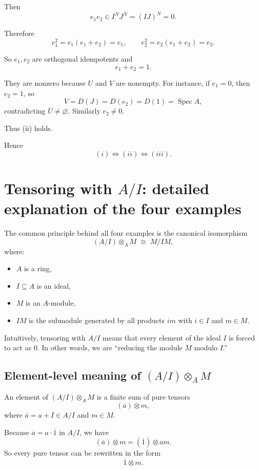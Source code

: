 \documentclass[12pt,a4paper]{article}
\DeclareMathOperator{\Spec}{Spec}
\theoremstyle{plain}
\theoremstyle{definition}      %
\begin{document}
	Then
	\[
	e_1e_2\in I^N J^N=(IJ)^N=0.
	\]
	
	Therefore
	\[
	e_1^2=e_1(e_1+e_2)=e_1,
	\qquad
	e_2^2=e_2(e_1+e_2)=e_2.
	\]
	
	So \(e_1,e_2\) are orthogonal idempotents and
	\[
	e_1+e_2=1.
	\]
	
	They are nonzero because \(U\) and \(V\) are nonempty.
	For instance, if \(e_1=0\), then \(e_2=1\), so
	\[
	V=D(J)=D(e_2)=D(1)=\Spec A,
	\]
	contradicting \(U\neq\varnothing\).
	Similarly \(e_2\neq 0\).
	
	Thus (ii) holds.
	
	\bigskip
	Hence
	\[
	(i)\Longleftrightarrow(ii)\Longleftrightarrow(iii).
	\]
	
	\section{Tensoring with \texorpdfstring{$A/I$}{A/I}: detailed explanation of the four examples}
	
	The common principle behind all four examples is the canonical isomorphism
	\[
	(A/I)\otimes_A M \;\cong\; M/IM,
	\]
	where:
	\begin{itemize}
		\item \(A\) is a ring,
		\item \(I\subseteq A\) is an ideal,
		\item \(M\) is an \(A\)-module,
		\item \(IM\) is the submodule generated by all products \(im\) with \(i\in I\) and \(m\in M\).
	\end{itemize}
	
	Intuitively, tensoring with \(A/I\) means that every element of the ideal \(I\) is forced to act as \(0\). In other words, we are ``reducing the module \(M\) modulo \(I\).''
	
	\subsection{Element-level meaning of \texorpdfstring{$(A/I)\otimes_A M$}{(A/I) tensor M}}
	
	An element of \((A/I)\otimes_A M\) is a finite sum of pure tensors
	\[
	(\overline{a})\otimes m,
	\]
	where \(\overline{a}=a+I\in A/I\) and \(m\in M\).
	
	Because \(\overline{a}=a\cdot \overline{1}\) in \(A/I\), we have
	\[
	(\overline{a})\otimes m
	=
	(\overline{1})\otimes am.
	\]
	So every pure tensor can be rewritten in the form
	\[
	\overline{1}\otimes m.
	\]
	
\end{document}
